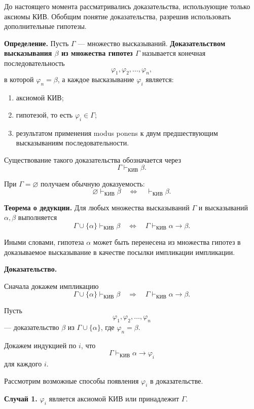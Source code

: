 \documentclass[12pt,a4paper,oneside,openany]{book}
\theoremstyle{definition}
\theoremstyle{plain}
\theoremstyle{remark}
\begin{document}
До настоящего момента рассматривались доказательства, использующие
только аксиомы КИВ. Обобщим понятие доказательства, разрешив использовать
дополнительные гипотезы.

\textbf{Определение.}
Пусть \(\Gamma\) --- множество высказываний.
\textbf{Доказательством высказывания \(\beta\) из множества гипотез
\(\Gamma\)} называется конечная последовательность
\[
\varphi_1,\varphi_2,\ldots,\varphi_n,
\]
в которой \(\varphi_n=\beta\), а каждое высказывание
\(\varphi_i\) является:

\begin{enumerate}
    \item аксиомой КИВ;
    \item гипотезой, то есть \(\varphi_i\in\Gamma\);
    \item результатом применения modus ponens к двум предшествующим
          высказываниям последовательности.
\end{enumerate}

Существование такого доказательства обозначается через
\[
\Gamma\vdash_{\mathrm{КИВ}}\beta.
\]

При \(\Gamma=\varnothing\) получаем обычную доказуемость:
\[
\varnothing\vdash_{\mathrm{КИВ}}\beta
\quad\Longleftrightarrow\quad
\vdash_{\mathrm{КИВ}}\beta.
\]

\textbf{Теорема о дедукции.}
Для любых множества высказываний \(\Gamma\) и высказываний
\(\alpha,\beta\) выполняется
\[
\Gamma\cup\{\alpha\}\vdash_{\mathrm{КИВ}}\beta
\quad\Longleftrightarrow\quad
\Gamma\vdash_{\mathrm{КИВ}}\alpha\to\beta.
\]

Иными словами, гипотеза \(\alpha\) может быть перенесена из множества
гипотез в доказываемое высказывание в качестве посылки импликации импликации.

\textbf{Доказательство.}

Сначала докажем импликацию
\[
\Gamma\cup\{\alpha\}\vdash_{\mathrm{КИВ}}\beta
\quad\Longrightarrow\quad
\Gamma\vdash_{\mathrm{КИВ}}\alpha\to\beta.
\]

Пусть
\[
\varphi_1,\varphi_2,\ldots,\varphi_n
\]
--- доказательство \(\beta\) из \(\Gamma\cup\{\alpha\}\), где
\(\varphi_n=\beta\).

Докажем индукцией по \(i\), что
\[
\Gamma\vdash_{\mathrm{КИВ}}\alpha\to\varphi_i
\]
для каждого \(i\).

Рассмотрим возможные способы появления \(\varphi_i\) в доказательстве.

\textbf{Случай 1.}
\(\varphi_i\) является аксиомой КИВ или принадлежит \(\Gamma\).
\end{document}
